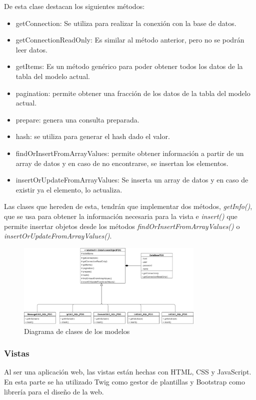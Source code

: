 De esta clase destacan los siguientes métodos: 
\begin{itemize}
    \item getConnection: Se utiliza para realizar la conexión con la base de datos. 
    \item getConnectionReadOnly: Es similar al método anterior, pero no se podrán leer datos.
    \item getItems: Es un método genérico para poder obtener todos los datos de la tabla del modelo actual.
    \item pagination: permite obtener una fracción de los datos de la tabla del modelo actual.
    \item prepare: genera una consulta preparada. 
    \item hash: se utiliza para generar el hash dado el valor. 
    \item findOrInsertFromArrayValues: permite obtener información a partir de un array de datos y en caso de no encontrarse, se insertan los elementos. 
    \item insertOrUpdateFromArrayValues: Se inserta un array de datos y en caso de existir ya el elemento, lo actualiza. 
\end{itemize}

Las clases que hereden de esta, tendrán que implementar dos métodos, \textit{getInfo()}, que se usa para obtener la información necesaria para la vista e \textit{insert()} que permite insertar objetos desde los métodos \textit{findOrInsertFromArrayValues()} o \textit{insertOrUpdateFromArrayValues()}. 


\begin{figure}[htb]
    \centering
    \includegraphics[width=0.8\textwidth]{imagenes/DiagramasClases/Modelos.png}
\caption{Diagrama de clases de los modelos}
\label{fig:DC_modelos}
\end{figure}

\subsubsection{Vistas}
Al ser una aplicación web, las vistas están hechas con HTML, CSS y JavaScript. En esta parte se ha utilizado Twig como gestor de plantillas y Bootstrap como librería para el diseño de la web. 

